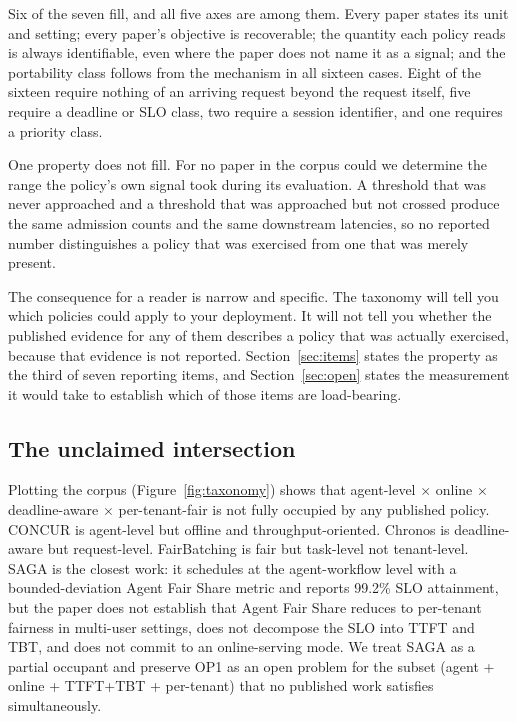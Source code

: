 Six of the seven fill, and all five axes are among them. Every paper states its unit and setting; every
paper's objective is recoverable; the quantity each policy reads is
always identifiable, even where the paper does not name it as a signal;
and the portability class follows from the mechanism in all sixteen
cases. Eight of the sixteen require nothing of an arriving request
beyond the request itself, five require a deadline or SLO class, two
require a session identifier, and one requires a priority class.

One property does not fill. For no paper in the corpus could we
determine the range the policy's own signal took during its evaluation.
A threshold that was never approached and a threshold that was
approached but not crossed produce the same admission counts and the
same downstream latencies, so no reported number distinguishes a policy
that was exercised from one that was merely present.

The consequence for a reader is narrow and specific. The taxonomy will
tell you which policies could apply to your deployment. It will not tell
you whether the published evidence for any of them describes a policy
that was actually exercised, because that evidence is not reported.
Section~\ref{sec:items} states the property as the third of seven
reporting items, and Section~\ref{sec:open} states the measurement it
would take to establish which of those items are load-bearing.

\subsection{The unclaimed intersection}

Plotting the corpus (Figure~\ref{fig:taxonomy}) shows that
agent-level $\times$ online $\times$ deadline-aware $\times$
per-tenant-fair is not fully occupied by any published policy.
CONCUR is agent-level but offline and throughput-oriented. Chronos
is deadline-aware but request-level. FairBatching is fair but
task-level not tenant-level. SAGA
\citep{guo2026saga} is the closest work: it schedules at the
agent-workflow level with a bounded-deviation Agent Fair Share
metric and reports 99.2\% SLO attainment, but the paper does not
establish that Agent Fair Share reduces to per-tenant fairness in
multi-user settings, does not decompose the SLO into TTFT and TBT,
and does not commit to an online-serving mode. We treat SAGA as a
partial occupant and preserve OP1 as an open problem for the
subset (agent + online + TTFT+TBT + per-tenant) that no published
work satisfies simultaneously.

